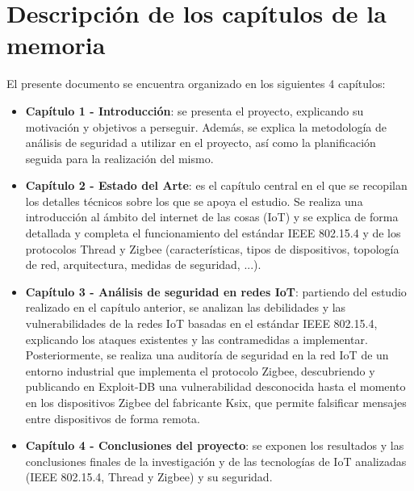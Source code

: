 \section{Descripción de los capítulos de la memoria} %
El presente documento se encuentra organizado en los siguientes 4 capítulos:
\begin{itemize}
\item{\bf Capítulo 1 - Introducción}: se presenta el proyecto, explicando su motivación y objetivos a perseguir. Además, se explica la metodología de análisis de seguridad a utilizar en  el proyecto, así como la planificación seguida para la realización del mismo.
\item{\bf Capítulo 2 - Estado del Arte}: es el capítulo central en el que se recopilan los detalles técnicos sobre los que se apoya el estudio. Se realiza una introducción al ámbito del internet de las cosas (IoT) y se explica de forma detallada y completa el funcionamiento del estándar IEEE 802.15.4 y de los protocolos Thread y Zigbee (características, tipos de dispositivos, topología de red, arquitectura, medidas de seguridad, ...).
\item{\bf Capítulo 3 - Análisis de seguridad en redes IoT}: partiendo del estudio realizado en el capítulo anterior, se analizan las debilidades y las vulnerabilidades de la redes IoT basadas en el estándar IEEE 802.15.4, explicando los ataques existentes y las contramedidas a implementar. Posteriormente, se realiza una auditoría de seguridad en la red IoT de un entorno industrial que implementa el protocolo Zigbee, descubriendo y publicando en Exploit-DB una vulnerabilidad desconocida hasta el momento en los dispositivos Zigbee del fabricante Ksix, que permite falsificar mensajes entre dispositivos de forma remota.
\item{\bf Capítulo 4 - Conclusiones del proyecto}: se exponen los resultados y las conclusiones finales de la investigación y de las tecnologías de IoT analizadas (IEEE 802.15.4, Thread y Zigbee) y su seguridad.
\end{itemize}
